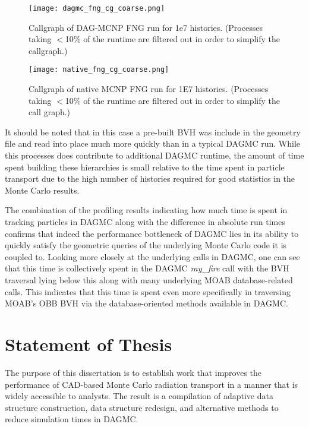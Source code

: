 \begin{figure}[H]
  \centering
  \caption{Callgraph of DAG-MCNP FNG run for 1e7 histories. (Processes taking
    $<$10\% of the runtime are filtered out in order to simplify the callgraph.)}
  \label{dagmc-fng-coarse}
  \texttt{[image: dagmc\_fng\_cg\_coarse.png]}
\end{figure}

\begin{figure}[H]
  \centering
  \caption{Callgraph of native MCNP FNG run for 1E7 histories. (Processes taking
    $<$10\% of the runtime are filtered out in order to simplify the call
    graph.)}
  \label{mcnp-fng-coarse}
  \texttt{[image: native\_fng\_cg\_coarse.png]}
\end{figure}


It should be noted that in this case a pre-built BVH was include in
the geometry file and read into place much more quickly than in a typical DAGMC
run. While this processes does contribute to additional DAGMC runtime, the
amount of time spent building these hierarchies is small relative to the time
spent in particle transport due to the high number of histories required for
good statistics in the Monte Carlo results.

The combination of the profiling results indicating how much time is spent in
tracking particles in DAGMC along with the difference in absolute run times
confirms that indeed the performance bottleneck of DAGMC lies in its ability to
quickly satisfy the geometric queries of the underlying Monte Carlo code it is
coupled to. Looking more closely at the underlying calls in DAGMC, one can see
that this time is collectively spent in the DAGMC \textit{ray\_fire} call with
the BVH traversal lying below this along with many underlying MOAB
database-related calls. This indicates that this time is spent even more
specifically in traversing MOAB's OBB BVH via the database-oriented methods
available in DAGMC.

\section{Statement of Thesis}

The purpose of this dissertation is to establish work that improves the
performance of CAD-based Monte Carlo radiation transport in a manner that is
widely accessible to analysts. The result is a compilation of adaptive data
structure construction, data structure redesign, and alternative methods to
reduce simulation times in DAGMC.



